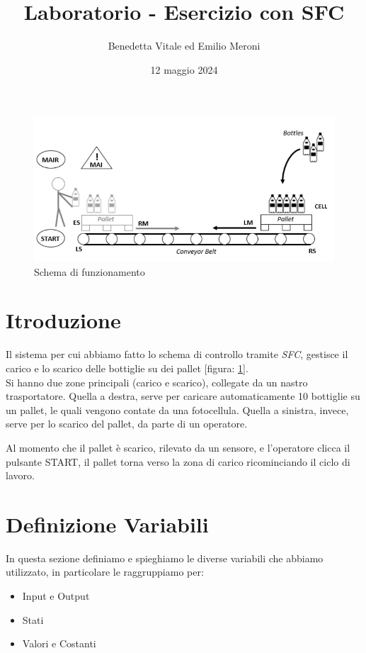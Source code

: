 \documentclass{article}
\title{Laboratorio - Esercizio con SFC}
\author{Benedetta Vitale ed Emilio Meroni}
\date{12 maggio 2024}
\begin{document}
\maketitle  %

\tableofcontents

\begin{figure}[b]
    \centering
    \includegraphics[width = 0.8 \linewidth]{schematico.png}
    \caption{Schema di funzionamento}
    \label{fig:schematico}
\end{figure}
\section{Itroduzione}
Il sistema per cui abbiamo fatto lo schema di controllo tramite \textit{SFC}, gestisce il carico e lo scarico delle bottiglie su dei pallet [figura: \ref{fig:schematico}].
\\

Si hanno due zone principali (carico e scarico), collegate da un nastro trasportatore. Quella a destra, serve per caricare automaticamente 10 bottiglie su un pallet, le quali vengono contate da una fotocellula. Quella a sinistra, invece, serve per lo scarico del pallet, da parte di un operatore.

Al momento che il pallet è scarico, rilevato da un sensore, e l'operatore clicca il pulsante START, il pallet torna verso la zona di carico ricominciando il ciclo di lavoro.

\section{Definizione Variabili}
In questa sezione definiamo e spieghiamo le diverse variabili che abbiamo utilizzato, in particolare le raggruppiamo per:
\begin{itemize}
    \item Input e Output
    \item Stati
    \item Valori e Costanti
\end{itemize}
\end{document}
